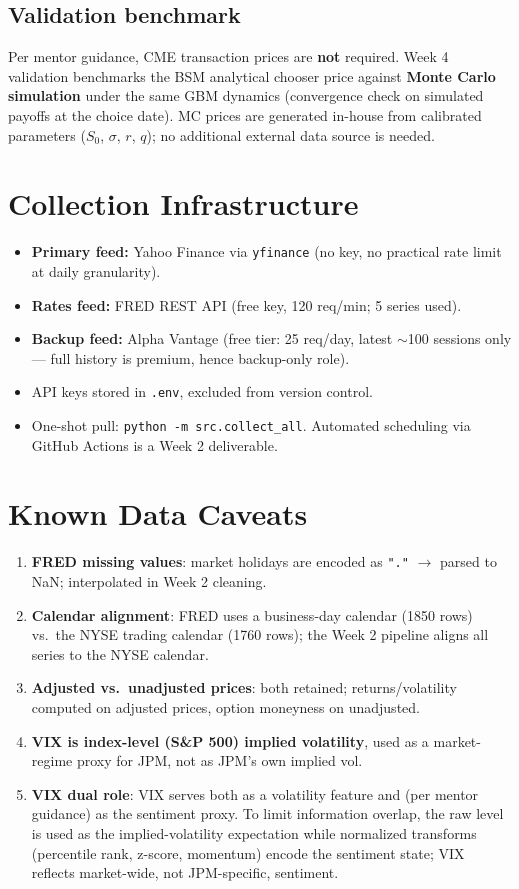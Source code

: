 \documentclass[11pt]{article}
\begin{document}
\subsection{Validation benchmark}
Per mentor guidance, CME transaction prices are \textbf{not} required. Week 4
validation benchmarks the BSM analytical chooser price against \textbf{Monte
Carlo simulation} under the same GBM dynamics (convergence check on simulated
payoffs at the choice date). MC prices are generated in-house from calibrated
parameters ($S_0$, $\sigma$, $r$, $q$); no additional external data source is
needed.

\section{Collection Infrastructure}
\begin{itemize}
  \item \textbf{Primary feed:} Yahoo Finance via \texttt{yfinance} (no key, no practical rate limit at daily granularity).
  \item \textbf{Rates feed:} FRED REST API (free key, 120 req/min; 5 series used).
  \item \textbf{Backup feed:} Alpha Vantage (free tier: 25 req/day, latest $\sim$100 sessions only --- full history is premium, hence backup-only role).
  \item API keys stored in \texttt{.env}, excluded from version control.
  \item One-shot pull: \texttt{python -m src.collect\_all}. Automated scheduling via GitHub Actions is a Week 2 deliverable.
\end{itemize}

\section{Known Data Caveats}
\begin{enumerate}
  \item \textbf{FRED missing values}: market holidays are encoded as \texttt{"."} $\to$ parsed to NaN; interpolated in Week 2 cleaning.
  \item \textbf{Calendar alignment}: FRED uses a business-day calendar (1850 rows) vs.\ the NYSE trading calendar (1760 rows); the Week 2 pipeline aligns all series to the NYSE calendar.
  \item \textbf{Adjusted vs.\ unadjusted prices}: both retained; returns/volatility computed on adjusted prices, option moneyness on unadjusted.
  \item \textbf{VIX is index-level (S\&P 500) implied volatility}, used as a market-regime proxy for JPM, not as JPM's own implied vol.
  \item \textbf{VIX dual role}: VIX serves both as a volatility feature and (per mentor guidance) as the sentiment proxy. To limit information overlap, the raw level is used as the implied-volatility expectation while normalized transforms (percentile rank, z-score, momentum) encode the sentiment state; VIX reflects market-wide, not JPM-specific, sentiment.
\end{enumerate}
\end{document}
